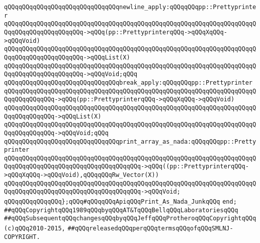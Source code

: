 \newline
\verb|qQQqqQQqqQQqqQQqqQQqqQQqqQQqqQQqnewline_apply:qQQqqQQqpp::Prettyprinter|\newline
\verb|qQQqqQQqqQQqqQQqqQQqqQQqqQQqqQQqqQQqqQQqqQQqqQQqqQQqqQQqqQQqqQQqqQQqqQQqqQQqqQQqqQQqqQQqqQQq->qQQq(pp::PrettyprinterqQQq->qQQqXqQQq->qQQqVoid)|\newline
\verb|qQQqqQQqqQQqqQQqqQQqqQQqqQQqqQQqqQQqqQQqqQQqqQQqqQQqqQQqqQQqqQQqqQQqqQQqqQQqqQQqqQQqqQQqqQQq->qQQqList(X)|\newline
\verb|qQQqqQQqqQQqqQQqqQQqqQQqqQQqqQQqqQQqqQQqqQQqqQQqqQQqqQQqqQQqqQQqqQQqqQQqqQQqqQQqqQQqqQQqqQQq->qQQqVoid;qQQq|\newline
\newline
\verb|qQQqqQQqqQQqqQQqqQQqqQQqqQQqqQQqbreak_apply:qQQqqQQqpp::Prettyprinter|\newline
\verb|qQQqqQQqqQQqqQQqqQQqqQQqqQQqqQQqqQQqqQQqqQQqqQQqqQQqqQQqqQQqqQQqqQQqqQQqqQQqqQQqqQQq->qQQq(pp::PrettyprinterqQQq->qQQqXqQQq->qQQqVoid)|\newline
\verb|qQQqqQQqqQQqqQQqqQQqqQQqqQQqqQQqqQQqqQQqqQQqqQQqqQQqqQQqqQQqqQQqqQQqqQQqqQQqqQQqqQQq->qQQqList(X)|\newline
\verb|qQQqqQQqqQQqqQQqqQQqqQQqqQQqqQQqqQQqqQQqqQQqqQQqqQQqqQQqqQQqqQQqqQQqqQQqqQQqqQQqqQQq->qQQqVoid;qQQq|\newline
\newline
\verb|qQQqqQQqqQQqqQQqqQQqqQQqqQQqqQQqprint_array_as_nada:qQQqqQQqpp::Prettyprinter|\newline
\verb|qQQqqQQqqQQqqQQqqQQqqQQqqQQqqQQqqQQqqQQqqQQqqQQqqQQqqQQqqQQqqQQqqQQqqQQqqQQqqQQqqQQqqQQqqQQqqQQqqQQqqQQqqQQq->qQQq((pp::PrettyprinterqQQq->qQQqXqQQq->qQQqVoid),qQQqqQQqRw_Vector(X))|\newline
\verb|qQQqqQQqqQQqqQQqqQQqqQQqqQQqqQQqqQQqqQQqqQQqqQQqqQQqqQQqqQQqqQQqqQQqqQQqqQQqqQQqqQQqqQQqqQQqqQQqqQQqqQQqqQQq->qQQqVoid;|\newline
\newline
\verb|qQQqqQQqqQQqqQQq};qQQq#qQQqqQQqApiqQQqPrint_As_Nada_JunkqQQq|\newline
\verb|end;|\newline
\newline
\verb|##qQQqCopyrightqQQq1989qQQqbyqQQqAT&TqQQqBellqQQqLaboratoriesqQQq|\newline
\verb|##qQQqSubsequentqQQqchangesqQQqbyqQQqJeffqQQqProtheroqQQqCopyrightqQQq(c)qQQq2010-2015,|\newline
\verb|##qQQqreleasedqQQqperqQQqtermsqQQqofqQQqSMLNJ-COPYRIGHT.|\newline

